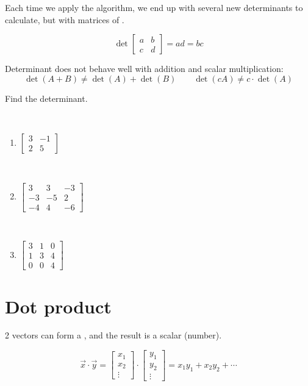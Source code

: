 \documentclass[11pt,fleqn]{book} %
\begin{document}
Each time we apply the algorithm, we end up with several new determinants to calculate, but with matrices of .

$$\det \begin{bmatrix} a & b \\ c & d \end{bmatrix} = ad = bc$$

Determinant does not behave well with addition and scalar multiplication:
$$\det(A + B) \neq \det(A) + \det(B) \qquad \det(cA) \neq c \cdot \det(A)$$

\begin{exercise}
    Find the determinant.

    {~~~}

    \begin{enumerate}
        \item $\begin{bmatrix} 3 & -1 \\ 2 & 5 \end{bmatrix}$

        {~~~}

        \item $\begin{bmatrix} 3 & 3 & -3 \\ -3 & -5 & 2 \\ -4 & 4 & -6 \end{bmatrix}$

        {~~~}

        \item $\begin{bmatrix} 3 & 1 & 0 \\ 1 & 3 & 4 \\ 0 & 0 & 4 \end{bmatrix}$
    \end{enumerate}
\end{exercise}

\section{Dot product}

2 vectors can form a , and the result is a scalar (number).

$$\vec{x} \cdot \vec{y} = \begin{bmatrix} x_1 \\ x_2 \\ \vdots \end{bmatrix} \cdot \begin{bmatrix} y_1 \\ y_2 \\ \vdots \end{bmatrix} = x_1y_1 + x_2y_2 + \cdots$$
\end{document}
